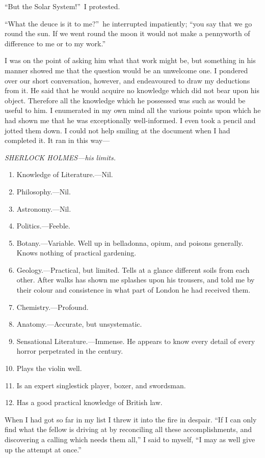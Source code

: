 \documentclass[12pt,english,oneside]{book}
\newcommand{\mdsh}[1]{\mbox{#1}\linebreak[1]}
\begin{document}
{}``But the Solar System!''\ I protested.

{}``What the deuce is it to me?''\ he interrupted impatiently;
{}``you say that we go round the sun. If we went round the moon it
would not make a pennyworth of difference to me or to my work.''

I was on the point of asking him what that work might be, but something
in his manner showed me that the question would be an unwelcome one.
I pondered over our short conversation, however, and endeavoured to
draw my deductions from it. He said that he would acquire no knowledge
which did not bear upon his object. Therefore all the knowledge which
he possessed was such as would be useful to him. I enumerated in my
own mind all the various points upon which he had shown me that he
was exceptionally well-informed. I even took a pencil and jotted them
down. I could not help smiling at the document when I had completed
it. It ran in this way\mdsh{---}

\bigskip{}
\begin{center}\emph{SHERLOCK HOLMES\mdsh{---}his limits.}\end{center}

\begin{enumerate}
\item Knowledge of Literature.\mdsh{---}Nil.
\item Philosophy.\mdsh{---}Nil.
\item Astronomy.\mdsh{---}Nil.
\item Politics.\mdsh{---}Feeble.
\item Botany.\mdsh{---}Variable. Well up in belladonna, opium, and poisons
generally. Knows nothing of practical gardening.
\item Geology.\mdsh{---}Practical, but limited. Tells at a glance different
soils from each other. After walks has shown me splashes upon his
trousers, and told me by their colour and consistence in what part
of London he had received them.
\item Chemistry.\mdsh{---}Profound. 
\item Anatomy.\mdsh{---}Accurate, but unsystematic. 
\item Sensational Literature.\mdsh{---}Immense. He appears to know every
detail of every horror perpetrated in the century.
\item Plays the violin well.
\item Is an expert singlestick player, boxer, and swordsman. 
\item Has a good practical knowledge of British law.
\end{enumerate}
When I had got so far in my list I threw it into the fire in despair.
{}``If I can only find what the fellow is driving at by reconciling
all these accomplishments, and discovering a calling which needs them
all,'' I said to myself, {}``I may as well give up the attempt at
once.''
\end{document}
